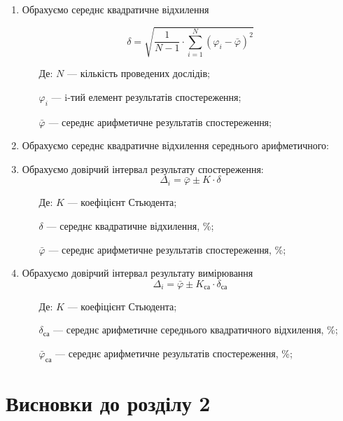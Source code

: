 \begin{enumerate}[leftmargin=*]
\item Обрахуємо середнє квадратичне відхилення

  \begin{equation}
    \delta = \sqrt{\frac{1}{N-1} \cdot \displaystyle\sum_{i=1}^{N} ({\varphi_i} -\bar{\varphi})^2}
  \end{equation}
  
  \begin{itemize}
  \item [Де:] $N$ --- кількість проведених дослідів;
  \item []$\varphi_i$ ---  i-тий елемент результатів спостереження;
  \item []$\bar{\varphi}$ ---  середнє арифметичне результатів спостереження;
  \end{itemize}

  
  
\item Обрахуємо середнє квадратичне відхилення середнього арифметичного:
  

\item Обрахуємо довірчий інтервал результату спостереження:
  \begin{equation}
    \Delta_i = \bar{\varphi} \pm K \cdot \delta
  \end{equation}

  \begin{itemize}
  \item [Де:] $K$ --- коефіцієнт Стьюдента;
  \item []$\delta$ ---  середнє квадратичне відхилення, \%;
  \item []$\bar{\varphi}$ ---  середнє арифметичне результатів спостереження, \%;
  \end{itemize}
  

\item Обрахуємо довірчий інтервал результату вимірювання
  \begin{equation}
    \Delta_i = \bar{\varphi} \pm K_{\text{са}} \cdot \delta_{\text{са}}
  \end{equation}

  \begin{itemize}
  \item [Де:] $K$ --- коефіцієнт Стьюдента;
  \item []$\delta_{\text{са}}$ ---  середнє арифметичне середнього квадратичного відхилення, \%;
  \item []$\bar{\varphi}_{\text{са}}$ ---  середнє арифметичне результатів спостереження, \%;
  \end{itemize}
\end{enumerate}
  
\section*{Висновки до розділу 2}
